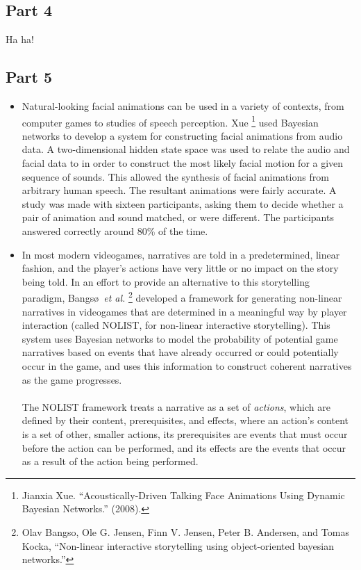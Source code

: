 \documentclass[11pt]{article}
\begin{document}
\subsection*{Part 4}
Ha ha!
\subsection*{Part 5}
\begin{itemize}
\item Natural-looking facial animations can be used in a variety of contexts, from computer games to studies of speech perception. Xue \footnote{Jianxia Xue. ``Acoustically-Driven Talking Face Animations Using Dynamic Bayesian Networks.'' (2008).} used Bayesian networks to develop a system for constructing facial animations from audio data. A two-dimensional hidden state space was used to relate the audio and facial data to in order to construct the most likely facial motion for a given sequence of sounds. This allowed the synthesis of facial animations from arbitrary human speech. The resultant animations were fairly accurate. A study was made with sixteen participants, asking them to decide whether a pair of animation and sound matched, or were different. The participants answered correctly around 80\% of the time.
\item In most modern videogames, narratives are told in a predetermined, linear fashion, and the player's actions have very little or no impact on the story being told. In an effort to provide an alternative to this storytelling paradigm, Bangs\o \ \emph{et al.} \footnote{Olav Bangso, Ole G. Jensen, Finn V. Jensen, Peter B. Andersen, and Tomas Kocka, “Non-linear interactive storytelling using object-oriented bayesian networks.”} developed a framework for generating non-linear narratives in videogames that are determined in a meaningful way by player interaction (called NOLIST, for non-linear interactive storytelling). This system uses Bayesian networks to model the probability of potential game narratives based on events that have already occurred or could potentially occur in the game, and uses this information to construct coherent narratives as the game progresses. \\
\\The NOLIST framework treats a narrative as a set of \emph{actions}, which are defined by their content, prerequisites, and effects, where an action's content is a set of other, smaller actions, its prerequisites are events that must occur before the action can be performed, and its effects are the events that occur as a result of the action being performed. \\

\end{itemize}
\end{document}

